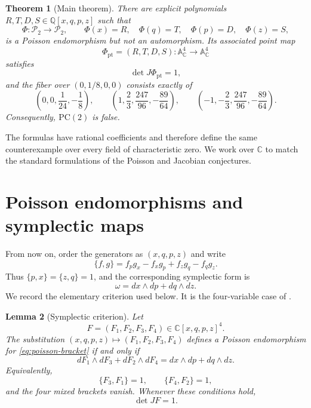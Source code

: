 \documentclass[11pt]{article}
\newcommand{\C}{\mathbb C}
\newcommand{\Q}{\mathbb Q}
\newcommand{\Aff}{\mathbb A}
\newcommand{\Pcal}{\mathcal P}
\newcommand{\PC}{\mathrm{PC}}
\newtheorem{theorem}{Theorem}[section]
\newtheorem{lemma}[theorem]{Lemma}
\theoremstyle{remark}
\begin{document}
\begin{theorem}[Main theorem]\label{thm:main}
There are explicit polynomials \(R,T,D,S\in\Q[x,q,p,z]\) such that
\begin{equation}\label{eq:Phi-intro}
  \Phi:\Pcal_2\longrightarrow\Pcal_2,
  \qquad
  \Phi(x)=R,\quad \Phi(q)=T,\quad \Phi(p)=D,\quad \Phi(z)=S,
\end{equation}
is a Poisson endomorphism but not an automorphism.  Its associated point map
\[
  \Phi_{\mathrm{pt}}=(R,T,D,S):\Aff^4_\C\longrightarrow\Aff^4_\C
\]
satisfies
\[
  \det J\Phi_{\mathrm{pt}}=1,
\]
and the fiber over \((0,1/8,0,0)\) consists exactly of
\begin{equation}\label{eq:three-points-intro}
  \left(0,0,\frac1{24},-\frac18\right),\qquad
  \left(1,\frac23,\frac{247}{96},-\frac{89}{64}\right),\qquad
  \left(-1,-\frac23,\frac{247}{96},-\frac{89}{64}\right).
\end{equation}
Consequently, \(\PC(2)\) is false.
\end{theorem}

The formulas have rational coefficients and therefore define the same
counterexample over every field of characteristic zero.  We work over \(\C\)
to match the standard formulations of the Poisson and Jacobian conjectures.

\section{Poisson endomorphisms and symplectic maps}\label{sec:preliminaries}

From now on, order the generators as \((x,q,p,z)\) and write
\begin{equation}\label{eq:poisson-bracket}
  \{f,g\}=f_p g_x-f_x g_p+f_z g_q-f_q g_z.
\end{equation}
Thus \(\{p,x\}=\{z,q\}=1\), and the corresponding symplectic form is
\begin{equation}\label{eq:omega}
  \omega=dx\wedge dp+dq\wedge dz.
\end{equation}
We record the elementary criterion used below.  It is the four-variable case
of \cite[Theorem~2.1 and Corollary~2.1]{AdjamagboVanDenEssen}.

\begin{lemma}[Symplectic criterion]\label{lem:symplectic-criterion}
Let
\[
  F=(F_1,F_2,F_3,F_4)\in\C[x,q,p,z]^4.
\]
The substitution
\(
  (x,q,p,z)\mapsto(F_1,F_2,F_3,F_4)
\)
defines a Poisson endomorphism for \eqref{eq:poisson-bracket} if and only if
\begin{equation}\label{eq:symplectic-criterion}
  dF_1\wedge dF_3+dF_2\wedge dF_4
  =dx\wedge dp+dq\wedge dz.
\end{equation}
Equivalently,
\[
  \{F_3,F_1\}=1,\qquad \{F_4,F_2\}=1,
\]
and the four mixed brackets vanish.  Whenever these conditions hold,
\begin{equation}\label{eq:symplectic-det-one}
  \det JF=1.
\end{equation}
\end{lemma}
\end{document}
